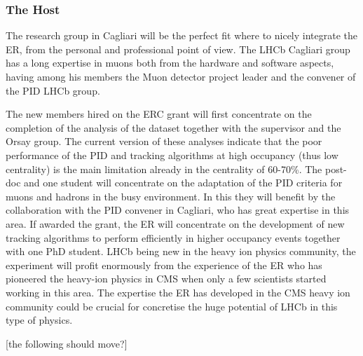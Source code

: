 \documentclass[a4paper,11pt]{article}
\begin{document}
\subsubsection{The Host}


The research group in Cagliari
will be the perfect fit where to nicely integrate the ER, from the
personal and professional point of view. 
The LHCb Cagliari group has a long expertise in 
muons both from the hardware and software 
aspects, having among his members the Muon 
detector project leader and the convener of the 
PID LHCb group.

The new members hired on the 
ERC grant will 
first concentrate on the completion of the analysis of the 
\PbPb dataset together with the supervisor and the 
Orsay group. The current 
version of these analyses indicate that the 
poor performance of the PID and tracking algorithms at high occupancy 
(thus low centrality) is the main limitation already 
in the centrality of 60-70\%. The post-doc and one student will 
concentrate on the adaptation of the PID criteria
for muons and hadrons in the busy \PbPb environment.
In this they will benefit by the collaboration 
with the PID convener in 
Cagliari, who has great expertise in this area.
If awarded the grant, the ER will concentrate on the development of 
new tracking algorithms to perform efficiently in higher 
occupancy events together with one PhD student. LHCb being new in the 
heavy ion physics community, the experiment
will profit enormously from the experience 
of the ER who has pioneered the heavy-ion physics 
in CMS when only a few scientists started working 
in this area. 
The expertise the ER has developed in the CMS 
heavy ion community could be crucial for 
concretise the huge potential of LHCb in this 
type of physics. 

[the following should move?] %
\end{document}

